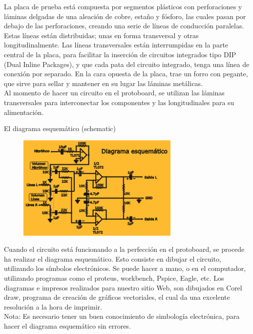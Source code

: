 \documentclass[12pt]{article}
\begin{document}
La placa de prueba está compuesta por segmentos plásticos con perforaciones y láminas delgadas de una aleación de cobre, estaño y fósforo, las cuales pasan por debajo de las perforaciones, creando una serie de líneas de conducción paralelas. Estas líneas están distribuidas; unas en forma transversal y otras longitudinalmente. Las líneas transversales están interrumpidas en la parte central de la placa, para facilitar la inserción de circuitos integrados tipo DIP (Dual Inline Packages), y que cada pata del circuito integrado, tenga una línea de conexión por separado. En la cara opuesta de la placa, trae un forro con pegante, que sirve para sellar y mantener en su lugar las láminas metálicas.\\
Al momento de hacer un circuito en el protoboard, se utilizan las láminas transversales para interconectar los componentes y las longitudinales para su alimentación.\par

El diagrama esquemático (schematic)\par




\begin{figure}[H]
	\begin{Center}
		\includegraphics[width=3.14in,height=2.03in]{./media/image4.jpeg}
	\end{Center}
\end{figure}



\par

Cuando el circuito está funcionando a la perfección en el protoboard, se procede ha realizar el diagrama esquemático. Esto consiste en dibujar el circuito, utilizando los símbolos electrónicos. Se puede hacer a mano, o en el computador, utilizando programas como el proteus, workbench, Pspice, Eagle, etc. Los diagramas e impresos realizados para nuestro sitio Web, son dibujados en Corel draw, programa de creación de gráficos vectoriales, el cual da una excelente resolución a la hora de imprimir.\\
Nota: Es necesario tener un buen conocimiento de simbología electrónica, para hacer el diagrama esquemático sin errores.\par
\end{document}
